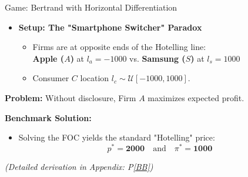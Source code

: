 \documentclass{beamer}
\begin{document}
\begin{frame}{Game: Bertrand with Horizontal Differentiation}
    \begin{itemize}
        \item \textbf{Setup: The "Smartphone Switcher" Paradox}
        \begin{itemize}
            \item Firms are at opposite ends of the Hotelling line:\\
                \textbf{Apple ($A$)} at $l_a = -1000$ \quad vs. \quad \textbf{Samsung ($S$)} at $l_s = 1000$
            \item Consumer $C$ location $l_c \sim \mathcal{U}[-1000, 1000]$.
        \end{itemize}
    \end{itemize}

    \vspace{0.3cm}
    
    \textbf{Problem:} Without disclosure, Firm $A$ maximizes expected profit.
    
    \vspace{0.2cm}

    \textbf{Benchmark Solution:}
    \begin{itemize}
        \item Solving the FOC yields the standard "Hotelling" price:
        \[ p^* = \mathbf{2000} \quad \text{and} \quad \pi^* = \mathbf{1000} \]
     \end{itemize}
     \vspace{0.2cm}
     \footnotesize{\textit{(Detailed derivation in Appendix: P\ref{BB})}}
\end{frame}
\end{document}
